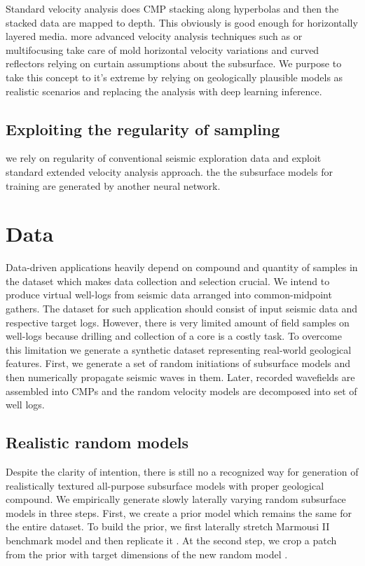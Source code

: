 \documentclass[manuscript]{geophysics}
\begin{document}
Standard velocity analysis does CMP stacking along hyperbolas and then the stacked data are mapped to depth. This obviously is good enough for horizontally layered media. more advanced velocity analysis techniques such as  or multifocusing take care of mold horizontal velocity variations and curved reflectors relying on curtain assumptions about the subsurface. We purpose to take this concept to it's extreme by relying on geologically plausible models as realistic scenarios and replacing the analysis with deep learning inference.

\subsection{Exploiting the regularity of sampling}
we rely on regularity of conventional seismic exploration data and exploit standard extended velocity analysis approach.  the
the subsurface models for training are generated by another neural network.


\section{Data}
Data-driven applications heavily depend on compound and quantity of samples in the dataset which makes data collection and selection crucial. 
%
We intend to produce virtual well-logs from seismic data arranged into common-midpoint gathers. The dataset for such application should consist of input seismic data and respective target logs. However, there is very limited amount of field samples on well-logs because drilling and collection of a core is a costly task. 
%
To overcome this limitation we generate a synthetic dataset representing real-world geological features. First, we generate a set of random initiations of subsurface models and then numerically propagate seismic waves in them. Later, recorded wavefields are assembled into CMPs and the random velocity models are decomposed into set of well logs.

\subsection{Realistic random models}
Despite the clarity of intention, there is still no a recognized way for generation of realistically textured all-purpose subsurface models with proper geological compound. 
%
We empirically generate slowly laterally varying random subsurface models in three steps. First, we create a prior model which remains the same for the entire dataset. To build the prior, we first laterally stretch Marmousi II benchmark model and then replicate it . At the second step, we crop a patch from the prior with target dimensions of the new random model . 
\end{document}
